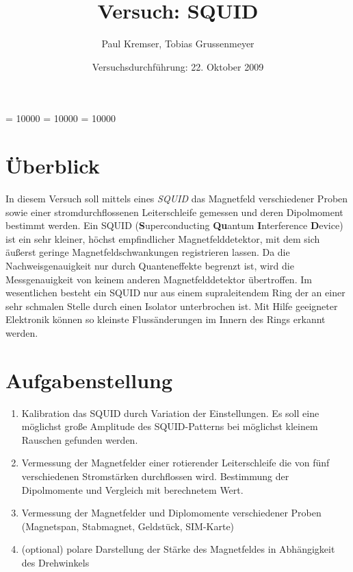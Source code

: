 \documentclass[12pt]{article}
\newcommand{\changefont}[3]{
\fontfamily{#1} \fontseries{#2} \fontshape{#3} \selectfont}
\begin{document}
\clubpenalty = 10000
\widowpenalty = 10000 
\displaywidowpenalty = 10000

\onehalfspacing
\changefont{ptm}{m}{n} 

\begin{titlepage}
\author{Paul Kremser, Tobias Grussenmeyer}
\title{Versuch: SQUID}
\date{Versuchsdurchführung: 22. Oktober 2009} 
\maketitle
\thispagestyle{empty}
\end{titlepage}


\tableofcontents
\thispagestyle{empty}
\newpage
{}
\section{Überblick}
In diesem Versuch soll mittels eines \textit{SQUID} das Magnetfeld verschiedener Proben sowie einer stromdurchflossenen Leiterschleife gemessen und deren Dipolmoment bestimmt werden. Ein SQUID (\textbf{S}uper\-conducting \textbf{Qu}antum \textbf{I}nterference \textbf{D}evice) ist ein sehr kleiner, höchst empfindlicher Magnetfelddetektor, mit dem sich äußerst geringe Magnetfeldschwankungen registrieren lassen. Da die Nachweisgenauigkeit nur durch Quanteneffekte begrenzt ist, wird die Messgenauigkeit von keinem anderen Magnetfelddetektor übertroffen. Im wesentlichen besteht ein SQUID nur aus einem supraleitendem Ring der an einer sehr schmalen Stelle durch einen Isolator unterbrochen ist. Mit Hilfe geeigneter Elektronik können so kleinste Flussänderungen im Innern des Rings erkannt werden.

\section{Aufgabenstellung}
\begin{enumerate}
 \item Kalibration das SQUID durch Variation der Einstellungen. Es soll eine möglichst große Amplitude des SQUID-Patterns bei möglichst kleinem Rauschen gefunden werden.
\item Vermessung der Magnetfelder einer rotierender Leiterschleife die von fünf verschiedenen Stromstärken durchflossen wird.  Bestimmung der Dipolmomente und Vergleich mit berechnetem Wert.
\item Vermessung der Magnetfelder und Diplomomente verschiedener Proben (Magnetspan, Stabmagnet, Geldstück, SIM-Karte)
\item (optional) polare Darstellung der Stärke des Magnetfeldes in Abhängigkeit des Drehwinkels
\end{enumerate}
\newpage
\end{document}
